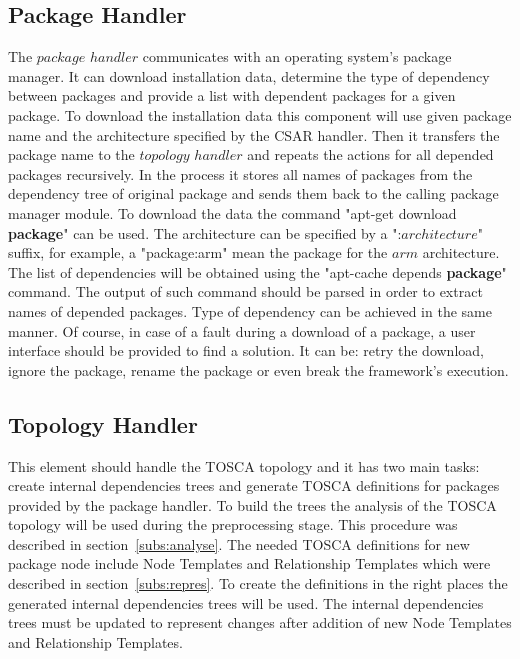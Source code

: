 \subsection{Package Handler} \label{subs:archph}
The $package$ $handler$ communicates with an operating system's package manager. 
It can download installation data, determine the type of dependency between packages and provide a list with dependent packages for a given package.
To download the installation data this component will use given package name and the architecture specified by the CSAR handler.
Then it transfers the package name to the $topology$ $handler$ and repeats the actions for all depended packages recursively. 
In the process it stores all names of packages from the dependency tree of original package and sends them back to the calling package manager module.
To download the data the command "apt-get download \textbf{package}" can be used. 
The architecture can be specified by a ":$architecture$" suffix, for example, a "package:arm" mean the package for the $arm$ architecture.
The list of dependencies will be obtained using the "apt-cache depends \textbf{package}" command. 
The output of such command should be parsed in order to extract names of depended packages.
Type of dependency can be achieved in the same manner.
Of course, in case of a fault during a download of a package, a user interface should be provided to find a solution.
It can be: retry the download, ignore the package, rename the package or even break the framework's execution.

\subsection{Topology Handler} \label{subs:archtop}
This element should handle the TOSCA topology and it has two main tasks: create internal dependencies trees and generate TOSCA definitions for packages provided by the package handler.
To build the trees the analysis of the TOSCA topology will be used during the preprocessing stage.
This procedure was described in section~\ref{subs:analyse}.
The needed TOSCA definitions for new package node include Node Templates and Relationship Templates which were described in section~\ref{subs:repres}.
To create the definitions in the right places the generated internal dependencies trees will be used.
The internal dependencies trees must be updated to represent changes after addition of new Node Templates and Relationship Templates.

